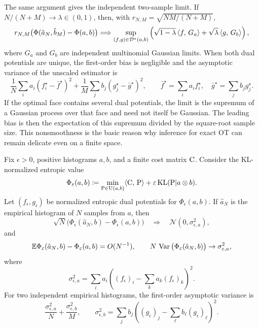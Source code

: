 The same argument gives the independent two-sample limit.  If \(N/(N+M)\to\lambda\in(0,1)\), then, with \(r_{N,M}=\sqrt{NM/(N+M)}\),
\[
	r_{N,M}\big(\Phi(\hat a_N,\hat b_M)-\Phi(a,b)\big)
	\Longrightarrow
	\sup_{(f,g)\in\mathcal D^\star(a,b)}
	\left(
		\sqrt{1-\lambda}\,\langle f,\,G_a\rangle
		+
		\sqrt{\lambda}\,\langle g,\,G_b\rangle
	\right),
\]
where \(G_a\) and \(G_b\) are independent multinomial Gaussian limits.  When both dual potentials are unique, the first-order bias is negligible and the asymptotic variance of the unscaled estimator is
\[
	\frac{1}{N}\sum_i a_i(f^\star_i-\bar f^\star)^2
	+
	\frac{1}{M}\sum_j b_j(g^\star_j-\bar g^\star)^2,
	\qquad
	\bar f^\star=\sum_i a_i f_i^\star,
	\quad
	\bar g^\star=\sum_j b_j g_j^\star.
\]
If the optimal face contains several dual potentials, the limit is the supremum of a Gaussian process over that face and need not itself be Gaussian.  The leading bias is then the expectation of this supremum divided by the square-root sample size.  This nonsmoothness is the basic reason why inference for exact OT can remain delicate even on a finite space.

\begin{prop}\label{prop-finite-entropic-ot-clt}
	Fix \(\epsilon>0\), positive histograms \(a,b\), and a finite cost matrix \(\mathrm{C}\).  Consider the KL-normalized entropic value
	\[
		\Phi_\varepsilon(a,b)
		\coloneqq
		\min_{\mathrm{P}\in\mathrm{U}(a,b)}
		\langle \mathrm{C},\,\mathrm{P}\rangle+\varepsilon\operatorname{KL}(\mathrm{P}|a\otimes b).
	\]
	Let \((f_\epsilon,g_\epsilon)\) be normalized entropic dual potentials for \(\Phi_\epsilon(a,b)\).  If \(\hat a_N\) is the empirical histogram of \(N\) samples from \(a\), then
	\[
		\sqrt N\big(\Phi_\epsilon(\hat a_N,b)-\Phi_\epsilon(a,b)\big)
		\quad\Longrightarrow\quad
		\mathcal N(0,\sigma_{\epsilon,a}^2),
	\]
	and
	\[
		\mathbb{E}\Phi_\varepsilon(\hat a_N,b)-\Phi_\varepsilon(a,b)=O(N^{-1}),
		\qquad
		N\,\operatorname{Var}\big(\Phi_\varepsilon(\hat a_N,b)\big)\to\sigma_{\varepsilon,a}^2,
	\]
	where
	\[
		\sigma_{\epsilon,a}^2
		=
		\sum_i a_i
		\left((f_\epsilon)_i-\sum_k a_k(f_\epsilon)_k\right)^2.
	\]
	For two independent empirical histograms, the first-order asymptotic variance is
	\[
		\frac{\sigma_{\epsilon,a}^2}{N}
		+
		\frac{\sigma_{\epsilon,b}^2}{M},
		\qquad
		\sigma_{\epsilon,b}^2
		=
		\sum_j b_j
		\left((g_\epsilon)_j-\sum_\ell b_\ell(g_\epsilon)_\ell\right)^2.
	\]
\end{prop}

